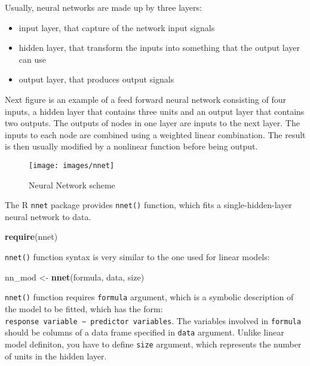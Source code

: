 \documentclass[]{book}
\newenvironment{Shaded}{\begin{snugshade}}{\end{snugshade}}
\newcommand{\KeywordTok}[1]{\textcolor[rgb]{0.13,0.29,0.53}{\textbf{{#1}}}}
\newcommand{\StringTok}[1]{\textcolor[rgb]{0.31,0.60,0.02}{{#1}}}
\newcommand{\NormalTok}[1]{{#1}}
\providecommand{\tightlist}{%
  \setlength{\itemsep}{0pt}\setlength{\parskip}{0pt}}
\def\tightlist{}
\begin{document}
Usually, neural networks are made up by three layers:

\begin{itemize}
\tightlist
\item
  input layer, that capture of the network input signals
\item
  hidden layer, that transform the inputs into something that the output
  layer can use
\item
  output layer, that produces output signals
\end{itemize}

Next figure is an example of a feed forward neural network consisting of
four inputs, a hidden layer that contains three units and an output
layer that contains two outputs. The outputs of nodes in one layer are
inputs to the next layer. The inputs to each node are combined using a
weighted linear combination. The result is then usually modified by a
nonlinear function before being output.

\begin{figure}[h]
\texttt{[image: images/nnet]} \caption{Neural Network scheme}\label{fig:g2}
\end{figure}

The R \texttt{nnet} package provides \texttt{nnet()} function, which
fits a single-hidden-layer neural network to data.

\begin{Shaded}
\begin{Highlighting}[]
\KeywordTok{require}\NormalTok{(nnet)}
\end{Highlighting}
\end{Shaded}

\texttt{nnet()} function syntax is very similar to the one used for
linear models:

\begin{Shaded}
\begin{Highlighting}[]
\NormalTok{nn_mod <-}\StringTok{ }\KeywordTok{nnet}\NormalTok{(formula, data, size)}
\end{Highlighting}
\end{Shaded}

\texttt{nnet()} function requires \texttt{formula} argument, which is a
symbolic description of the model to be fitted, which has the form:
\texttt{response\ variable\ ∼\ predictor\ variables}. The variables
involved in \texttt{formula} should be columns of a data frame specified
in \texttt{data} argument. Unlike linear model definiton, you have to
define \texttt{size} argument, which represents the number of units in
the hidden layer.
\end{document}
